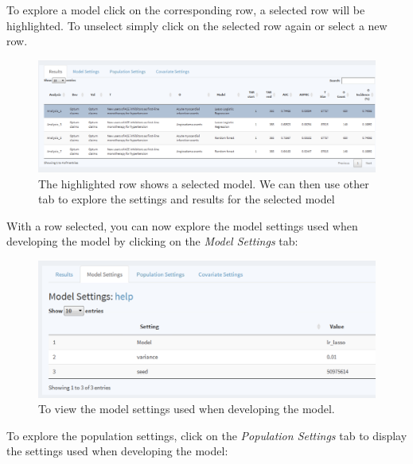 \documentclass[11pt]{book}
\theoremstyle{definition}
\theoremstyle{definition}
\theoremstyle{definition}
\theoremstyle{remark}
\begin{document}
To explore a model click on the corresponding row, a selected row will be highlighted. To unselect simply click on the selected row again or select a new row.

\begin{figure}

{\centering \includegraphics[width=0.8\linewidth]{images/PatientLevelPrediction/shiny/shinySelect} 

}

\caption{The highlighted row shows a selected model.  We can then use other tab to explore the settings and results for the selected model}\label{fig:shinySelect}
\end{figure}

With a row selected, you can now explore the model settings used when developing the model by clicking on the \emph{Model Settings} tab:

\begin{figure}

{\centering \includegraphics[width=0.8\linewidth]{images/PatientLevelPrediction/shiny/shinyModel} 

}

\caption{To view the model settings used when developing the model.}\label{fig:shinyModel}
\end{figure}

To explore the population settings, click on the \emph{Population Settings} tab to display the settings used when developing the model:
\end{document}
